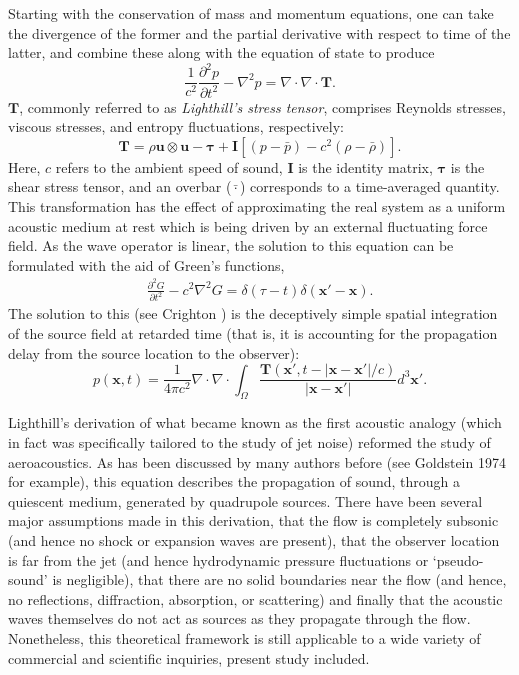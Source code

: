 Starting with the conservation of mass and momentum equations, one can take the divergence of the former and the partial derivative with respect to time of the latter, and combine these along with the equation of state to produce
\begin{equation}
\frac{1}{c^2}\frac{\partial^2 p}{\partial t^2} - \nabla^2 p = \nabla \cdot \nabla \cdot \mathbf{T}.
\label{eq:lighthill_analogy}
\end{equation}
$\mathbf{T}$, commonly referred to as \textit{Lighthill's stress tensor}, comprises Reynolds stresses, viscous stresses, and entropy fluctuations, respectively:
\begin{equation}
\mathbf{T} = \rho \mathbf{u} \otimes \mathbf{u} - \mathbf{\tau} + \mathbf{I} \left[ (p-\bar{p}) - c^2 (\rho - \bar{\rho}) \right].
\end{equation}
Here, $c$ refers to the ambient speed of sound, $\mathbf{I}$ is the identity matrix, $\mathbf{\tau}$ is the shear stress tensor, and an overbar ($\bar{\cdot}$) corresponds to a time-averaged quantity.
This transformation has the effect of approximating the real system as a uniform acoustic medium at rest which is being driven by an external fluctuating force field.
As the wave operator is linear, the solution to this equation can be formulated with the aid of Green's functions,
\begin{eqnarray}
\frac{\partial^2 G}{\partial t^2} - c^2 \nabla^2 G = \delta (\tau -t) \delta (\mathbf{x}' - \mathbf{x}).
\end{eqnarray}
The solution to this (see Crighton \etal [cite]) is the deceptively simple spatial integration of the source field at retarded time (that is, it is accounting for the propagation delay from the source location to the observer):
\begin{equation}
p (\mathbf{x},t) = \frac{1}{4 \pi c^2} \nabla \cdot \nabla \cdot \int_{\Omega} \frac{\mathbf{T} (\mathbf{x}',t - |\mathbf{x} - \mathbf{x}'|/c)}{|\mathbf{x} - \mathbf{x}'|} d^3 \mathbf{x}'.
\label{eq:source_integration}
\end{equation}

Lighthill's derivation of what became known as the first acoustic analogy (which in fact was specifically tailored to the study of jet noise) reformed the study of aeroacoustics.
As has been discussed by many authors before (see Goldstein 1974 for example), this equation describes the propagation of sound, through a quiescent medium, generated by quadrupole sources. There have been several major assumptions made in this derivation, that the flow is completely subsonic (and hence no shock or expansion waves are present), that the observer location is far from the jet (and hence hydrodynamic pressure fluctuations or `pseudo-sound' is negligible), that there are no solid boundaries near the flow (and hence, no reflections, diffraction, absorption, or scattering) and finally that the acoustic waves themselves do not act as sources as they propagate through the flow.
Nonetheless, this theoretical framework is still applicable to a wide variety of commercial and scientific inquiries, present study included.

